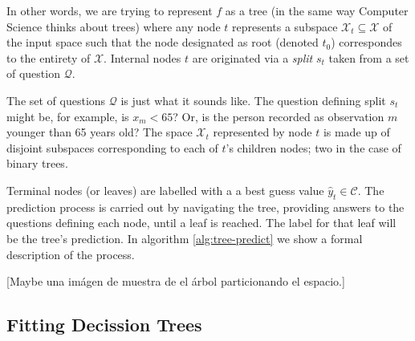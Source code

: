 In other words, we are trying to represent $f$ as a tree (in the same way
Computer Science thinks about trees) where any node $t$ represents a subspace
$\mathcal{X}_t \subseteq \mathcal{X}$ of the input space such that the node
designated as root (denoted $t_0$) correspondes to the entirety of
$\mathcal{X}$. Internal nodes $t$ are originated via a \textit{split} $s_t$
taken from a set of question $\mathcal{Q}$.

The set of questions $\mathcal{Q}$ is just what it sounds like. The question
defining split $s_t$ might be, for example, is $x_m < 65$? Or, is the person
recorded as observation $m$ younger than 65 years old? The space $\mathcal{X}_t$
represented by node $t$ is made up of disjoint subspaces corresponding to each
of $t$'s children nodes; two in the case of binary trees. 

Terminal nodes (or leaves) are labelled with a a best guess value $\widehat{y}_t
\in \mathcal{C}$. The prediction process is carried out by navigating the tree,
providing answers to the questions defining each node, until a leaf is reached.
The label for that leaf will be the tree's prediction. In algorithm
\ref{alg:tree-predict} we show a formal description of the process.

\begin{algorithm}
    \caption{Prediction of the output value $\widehat{y}$ from tree $f_\L$.}
    \label{alg:tree-predict}
\end{algorithm}

[Maybe una imágen de muestra de el árbol particionando el espacio.]

\subsection{Fitting Decission Trees}